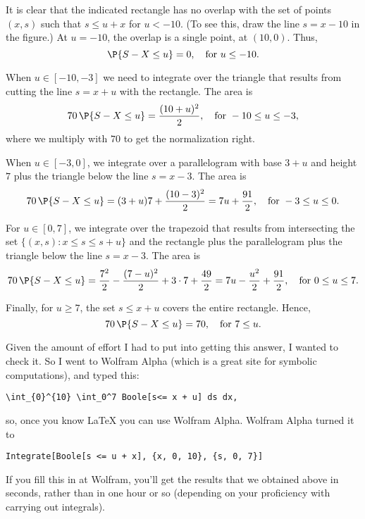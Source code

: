 \begin{exercise}
\begin{solution}
It is clear that the indicated rectangle has no overlap with the set of points $(x,s)$ such that $s\leq u + x$ for $u<-10$. (To see this, draw the line $s=x-10$ in the figure.) At $u=-10$, the overlap is a single point, at $(10,0)$. Thus, 
\begin{equation*}
\P{S-X \leq u}=0, \quad \text{for } u\leq -10.
\end{equation*}

When $u\in[-10, -3]$ we need to integrate over the triangle that results from cutting the line $s=x+u$ with the rectangle. The area is 
\begin{equation*}
70\, \P{S-X \leq u}= \frac{(10+u)^2}2, \quad \text{for } -10 \leq u\leq -3,
\end{equation*}
where we multiply with $70$ to get the normalization right. 

When $u\in[-3, 0]$, we integrate over a parallelogram with base $3+u$ and height $7$ plus the triangle below the line $s=x-3$. The area is 
\begin{equation*}
70\, \P{S-X \leq u}= (3+u)7 + \frac{(10-3)^2}2=7u + \frac{91}2, \quad \text{for } -3 \leq u\leq 0.
\end{equation*}

For $u\in[0, 7]$, we integrate over the trapezoid that results from intersecting the set $\{(x,s) : x \leq s \leq s + u\}$ and the rectangle plus the parallelogram plus the triangle below the line $s=x-3$. The area is 
\begin{equation*}
70\, \P{S-X \leq u}= \frac{7^2}2 - \frac{(7-u)^2}{2} + 3\cdot 7 + \frac{49}2 = 7 u - \frac{u^2}2 + \frac{91}2, \quad \text{for } 0\leq u\leq 7.
\end{equation*}

Finally, for $u\geq 7$, the set $s\leq x+u$ covers the entire rectangle. Hence, 
\begin{equation*}
70\, \P{S-X \leq u}= 70, \quad \text{for } 7\leq u.
\end{equation*}

Given the amount of effort I had to put into getting this answer, I wanted to check it. So I went to Wolfram Alpha (which is a great site for symbolic computations), and typed this: 
\begin{verbatim}
\int_{0}^{10} \int_0^7 Boole[s<= x + u] ds dx,
\end{verbatim}
so, once you know \LaTeX\/ you can use Wolfram Alpha. Wolfram Alpha turned it to 
\begin{verbatim}
Integrate[Boole[s <= u + x], {x, 0, 10}, {s, 0, 7}]
\end{verbatim}
If you fill this in at Wolfram, you'll get the results that we obtained above in seconds, rather than in one hour or so (depending on your proficiency with carrying out integrals).
\end{solution}
\end{exercise}

